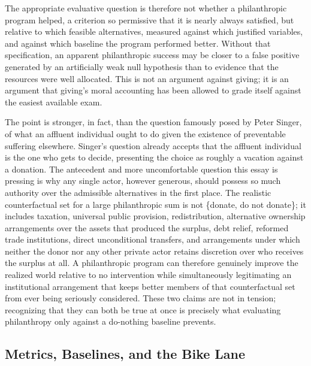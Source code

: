 \documentclass[11pt]{article}
\begin{document}
The appropriate evaluative question is therefore not whether a philanthropic program helped, a criterion so permissive that it is nearly always satisfied, but relative to which feasible alternatives, measured against which justified variables, and against which baseline the program performed better. Without that specification, an apparent philanthropic success may be closer to a false positive generated by an artificially weak null hypothesis than to evidence that the resources were well allocated. This is not an argument against giving; it is an argument that giving's moral accounting has been allowed to grade itself against the easiest available exam.

The point is stronger, in fact, than the question famously posed by Peter Singer, of what an affluent individual ought to do given the existence of preventable suffering elsewhere. Singer's question already accepts that the affluent individual is the one who gets to decide, presenting the choice as roughly a vacation against a donation. The antecedent and more uncomfortable question this essay is pressing is why any single actor, however generous, should possess so much authority over the admissible alternatives in the first place. The realistic counterfactual set for a large philanthropic sum is not \{donate, do not donate\}; it includes taxation, universal public provision, redistribution, alternative ownership arrangements over the assets that produced the surplus, debt relief, reformed trade institutions, direct unconditional transfers, and arrangements under which neither the donor nor any other private actor retains discretion over who receives the surplus at all. A philanthropic program can therefore genuinely improve the realized world relative to no intervention while simultaneously legitimating an institutional arrangement that keeps better members of that counterfactual set from ever being seriously considered. These two claims are not in tension; recognizing that they can both be true at once is precisely what evaluating philanthropy only against a do-nothing baseline prevents.

\subsection{Metrics, Baselines, and the Bike Lane}
\end{document}
